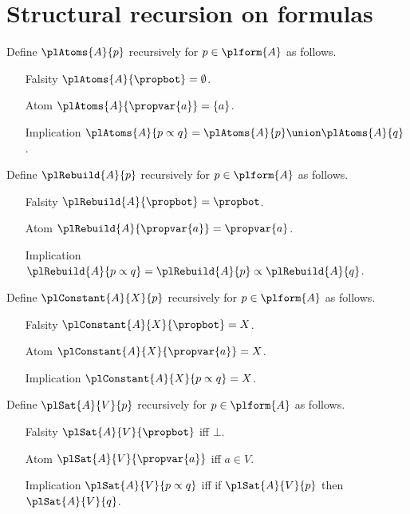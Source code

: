 


\section{Structural recursion on formulas}

\begin{recursive-definition}\label{pl_atoms}
    Define $\plAtoms{A}{p}$ recursively for $p\in\plform{A}$ as follows.
    \begin{enumerate}
        \item[Falsity] $\plAtoms{A}{\propbot}=\emptyset$.
        \item[Atom] $\plAtoms{A}{\propvar{a}}=\{a\}$.
        \item[Implication] $\plAtoms{A}{p\propto q}=\plAtoms{A}{p}\union\plAtoms{A}{q}$.
    \end{enumerate}
\end{recursive-definition}

\begin{recursive-definition}[Reconstruction]\label{pl_rebuild}
    Define $\plRebuild{A}{p}$ recursively for $p\in\plform{A}$ as follows.
    \begin{enumerate}
        \item[Falsity] $\plRebuild{A}{\propbot}=\propbot$.
        \item[Atom] $\plRebuild{A}{\propvar{a}}=\propvar{a}$.
        \item[Implication] $\plRebuild{A}{p\propto q}=\plRebuild{A}{p}\propto\plRebuild{A}{q}$.
    \end{enumerate}
\end{recursive-definition}

\begin{recursive-definition}\label{pl_constant}
    Define $\plConstant{A}{X}{p}$ recursively for $p\in\plform{A}$ as follows.
    \begin{enumerate}
        \item[Falsity] $\plConstant{A}{X}{\propbot}=X$.
        \item[Atom] $\plConstant{A}{X}{\propvar{a}}=X$.
        \item[Implication] $\plConstant{A}{X}{p\propto q}=X$.
    \end{enumerate}
\end{recursive-definition}

\begin{recursive-definition}[Satisfaction]\label{pl_satisfaction}
    Define $\plSat{A}{V}{p}$ recursively for $p\in\plform{A}$ as follows.
    \begin{enumerate}
        \item[Falsity] $\plSat{A}{V}{\propbot}$ iff $\bot$.
        \item[Atom] $\plSat{A}{V}{\propvar{a}}$ iff $a\in V$.
        \item[Implication] $\plSat{A}{V}{p\propto q}$ iff
            if $\plSat{A}{V}{p}$ then $\plSat{A}{V}{q}$.
    \end{enumerate}
\end{recursive-definition}
